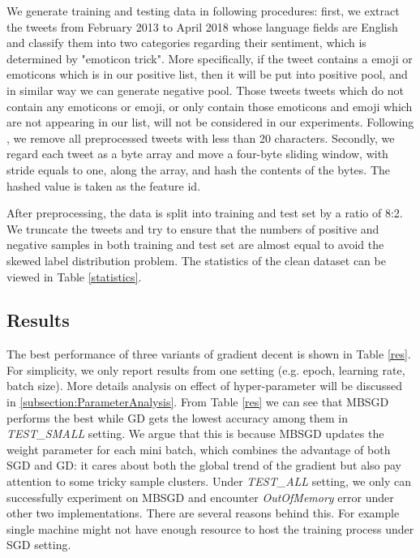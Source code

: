 \documentclass[sigconf]{acmart}
\begin{document}
We generate training and testing data in following procedures: first, we extract the tweets from February 2013 to April 2018 whose language fields are English and classify them into two categories regarding their sentiment, which is determined by "emoticon trick". More specifically, if the tweet contains a emoji or emoticons which is in our positive list, then it will be put into positive pool, and in similar way we can generate negative pool. Those tweets tweets which do not contain any emoticons or emoji, or only contain those emoticons and emoji which are not appearing in our list, will not be considered in our experiments. Following \citet{lin2012large}, we remove all preprocessed tweets with less than 20 characters. Secondly, we regard each tweet as a byte array and move a four-byte sliding window, with stride equals to one, along the array, and hash the contents of the bytes. The hashed value is taken as the feature id. 

After preprocessing, the  data is split into training and test set by a ratio of 8:2. We truncate the tweets and try to ensure that the numbers of positive and negative samples in both training and test set are almost equal to avoid the skewed label distribution problem. The statistics of the clean dataset can be viewed in Table \ref{statistics}.


\subsection{Results}
\label{subsection:results}

The best performance of three variants of gradient decent is shown in Table \ref{res}. For simplicity, we only report results from one setting (e.g. epoch, learning rate, batch size). More details analysis on effect of hyper-parameter will be discussed in \ref{subsection:ParameterAnalysis}. From Table \ref{res} we can see that MBSGD performs the best while GD gets the lowest accuracy among them in \textit{TEST\_SMALL} setting. We argue that this is because MBSGD updates the weight parameter for each mini batch, which combines the advantage of both SGD and GD: it cares about both the global trend of the gradient but also pay attention to some tricky sample clusters. Under \textit{TEST\_ALL} setting, we only can successfully experiment on MBSGD and encounter \textit{OutOfMemory} error under other two implementations. There are several reasons behind this. For example single machine might not have enough resource to host the training process under SGD setting. 
\end{document}
